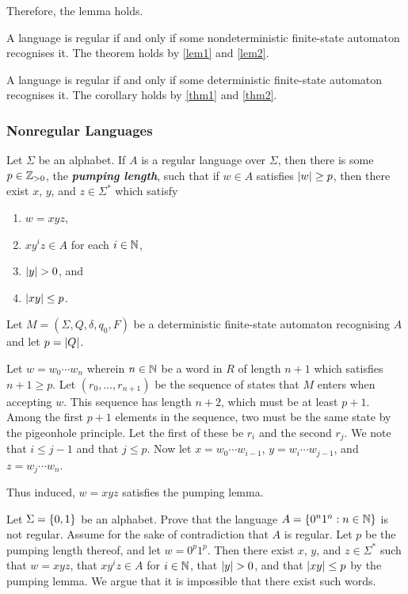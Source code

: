     Therefore, the lemma holds.
\Epr

\Bth
    \label{thm2}
    A language is regular if and only if some nondeterministic finite-state
    automaton recognises it.
\Eth
\Bpr
    The theorem holds by \autoref{lem1} and \autoref{lem2}.
\Epr

\Bcr
    A language is regular if and only if some deterministic finite-state
    automaton recognises it.
\Ecr
\Bpr
    The corollary holds by \autoref{thm1} and \autoref{thm2}.
\Epr

\subsubsection{Nonregular Languages}

    Let \(\Sigma\) be an alphabet. If \(A\) is a regular language over
    \(\Sigma\), then there is some \(p \in \mathbb{Z}_{>0}\), the
    \textbf{\textit{pumping length}}, such that if \(w \in A\) satisfies
    \(\lvert w\rvert \geq p\), then there exist \(x\), \(y\), and \(z \in \Sigma^*\)
    which satisfy
    \begin{enumerate}
        \item \(w = x y z\),
        \item \(x y^i z \in A\) for each \(i \in \mathbb{N}\),
        \item \(\lvert y\rvert > 0\), and
        \item \(\lvert x y \rvert \leq p\).
    \end{enumerate}
\Eth
\Bpr
    Let \(M = (\Sigma, Q, \delta, q_0, F)\) be a deterministic finite-state
    automaton recognising \(A\) and let \(p = \lvert Q\rvert\).

    Let \(w = w_0 \cdots w_n\) wherein \(n \in \mathbb{N}\) be a word in \(R\) of
    length \(n + 1\) which satisfies \(n + 1 \geq p\). Let \((r_0, \ldots, r_{n
    + 1})\) be the sequence of states that \(M\) enters when accepting \(w\).
    This sequence has length \(n + 2\), which must be at least \(p + 1\). Among
    the first \(p + 1\) elements in the sequence, two must be the same state by
    the pigeonhole principle. Let the first of these be \(r_i\) and the second
    \(r_j\). We note that \(i \leq j - 1\) and that \(j \leq p\). Now let \(x =
    w_0 \cdots w_{i - 1}\), \(y = w_i \cdots w_{j - 1}\), and \(z = w_j \cdots
    w_n\).

    Thus induced, \(w = x y z\) satisfies the pumping lemma.
\Epr

\Bxr
    Let \(\Sigma = \{0, 1\}\) be an alphabet. Prove that the language
    \(A = \{0^n 1^n : n \in \mathbb{N}\}\) is not regular.
\Exr
\Bsl
    Assume for the sake of contradiction that \(A\) is regular. Let \(p\) be the
    pumping length thereof, and let \(w = 0^p 1^p\). Then there exist \(x\),
    \(y\), and \(z \in \Sigma^*\) such that \(w = x y z\), that \(x y^i z \in
    A\) for \(i \in \mathbb{N}\), that \(\lvert y\rvert > 0\), and that \(\lvert x y\rvert \leq
    p\) by the pumping lemma. We argue that it is impossible that there exist
    such words.

